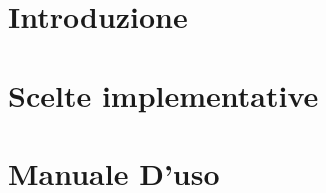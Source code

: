 \documentclass{article}
\begin{document}
  \section{Introduzione}
  \section{Scelte implementative}
  \section{Manuale D'uso}
\end{document}
